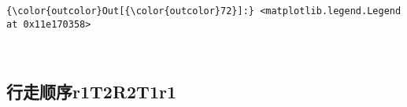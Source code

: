 \documentclass[11pt]{article}
\begin{document}
\begin{Verbatim}[commandchars=\\\{\}]
{\color{outcolor}Out[{\color{outcolor}72}]:} <matplotlib.legend.Legend at 0x11e170358>
\end{Verbatim}
            
    \begin{center}
    \end{center}
    { \hspace*{\fill} \\}
    
    \subsection{行走顺序r1T2R2T1r1}\label{ux884cux8d70ux987aux5e8fr1t2r2t1r1}
\end{document}
